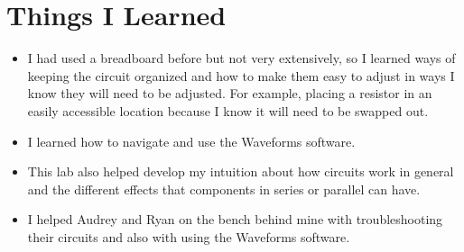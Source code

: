 \documentclass{article}
\begin{document}
    \section{Things I Learned}
    \begin{itemize}
        \item I had used a breadboard before but not very extensively, so I learned ways of keeping the circuit organized and how to make them easy to adjust in ways I know they will need to be adjusted. For example, placing a resistor in an easily accessible location because I know it will need to be swapped out.
        \item I learned how to navigate and use the Waveforms software.
        \item This lab also helped develop my intuition about how circuits work in general and the different effects that components in series or parallel can have. 
        \item I helped Audrey and Ryan on the bench behind mine with troubleshooting their circuits and also with using the Waveforms software. 
    \end{itemize}
\end{document}
